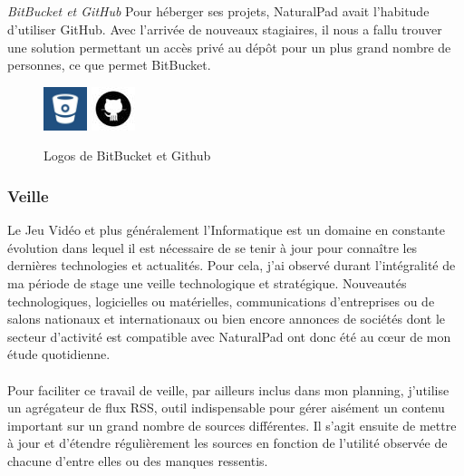 		\subparagraph{}	\emph{BitBucket et GitHub}
Pour héberger ses projets, NaturalPad avait l'habitude d'utiliser GitHub. Avec l'arrivée de nouveaux stagiaires, il nous a fallu trouver une solution permettant un accès privé au dépôt pour un plus grand nombre de personnes, ce que permet BitBucket.
	\begin{figure}[!h]
		\centering
		\includegraphics[height=48px]{images/bitbucket.jpg}
		\includegraphics[height=48px]{images/github.jpg}
		\caption{Logos de BitBucket et Github}
		\label{logos_bitbucket_github}
	\end{figure}

	\subsubsection{Veille}
Le Jeu Vidéo et plus généralement l'Informatique est un domaine en constante évolution dans lequel il est nécessaire de se tenir à jour pour connaître les dernières technologies et actualités. Pour cela, j'ai observé durant l'intégralité de ma période de stage une veille technologique et stratégique. Nouveautés technologiques, logicielles ou matérielles, communications d'entreprises ou de salons nationaux et internationaux ou bien encore annonces de sociétés dont le secteur d'activité est compatible avec NaturalPad ont donc été au cœur de mon étude quotidienne.
\paragraph{}Pour faciliter ce travail de veille, par ailleurs inclus dans mon planning, j'utilise un agrégateur de flux RSS, outil indispensable pour gérer aisément un contenu important sur un grand nombre de sources différentes. Il s'agit ensuite de mettre à jour et d'étendre régulièrement les sources en fonction de l'utilité observée de chacune d'entre elles ou des manques ressentis. 
